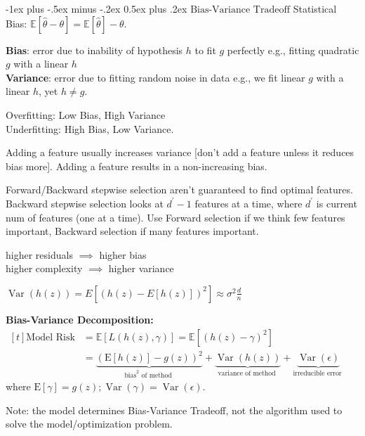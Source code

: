 \documentclass[10pt,landscape]{article}
\makeatletter
\DeclareMathOperator*{\Var}{Var}
\def\E{\mathbb{E}}
\renewcommand{\section}{\@startsection{section}{1}{0mm}%
                                {-1ex plus -.5ex minus -.2ex}%
                                {0.5ex plus .2ex}%
                                {\normalfont\large\bfseries}}
\makeatother
\begin{document}
\begin{multicols}{3}
\section{$\boxed{\text{Bias-Variance Tradeoff}}$}
Statistical Bias: $\E[\hat\theta-\theta]=\E[\hat\theta]-\theta$.

\textbf{Bias}: error due to inability of hypothesis $h$ to fit $g$ perfectly e.g., fitting quadratic $g$ with a linear $h$\\
\textbf{Variance}: error due to fitting random noise in data
e.g., we fit linear $g$ with a linear $h$, yet $h \neq g$.

Overfitting: Low Bias, High Variance \\
Underfitting: High Bias, Low Variance.

Adding a feature usually increases variance [don’t add a feature unless it reduces bias more]. Adding a feature results in a non-increasing bias. 

Forward/Backward stepwise selection aren't guaranteed to find optimal features. Backward stepwise selection looks at $d^{\prime}-1$ features at a time, where $d^{\prime}$ is current num of features (one at a time). Use Forward selection if we think few features important, Backward selection if many features important.

higher residuals $\implies$ higher bias\\
higher complexity $\implies$ higher variance

$\Var(h(z)) = E\left[(h(z)-E[h(z)])^{2}\right] \approx \sigma^2\frac d n$

\textbf{Bias-Variance Decomposition:} \\
$\begin{aligned}[t] \text{Model Risk} &=\E[L(h(z), \gamma)]
=\E[(h(z)-\gamma)^2] \\
&=\underbrace{(\mathrm{E}[h(z)]-g(z))^{2}}_{\text {bias}^{2} \text { of method }}+\underbrace{\operatorname{Var}(h(z))}_{\text {variance of method }}+\underbrace{\operatorname{Var}(\epsilon)}_{\text {irreducible error }}
\end{aligned}$ where $\mathrm{E}[\gamma]=g(z) ; \operatorname{Var}(\gamma)=\operatorname{Var}(\epsilon)$.

Note: the model determines Bias-Variance Tradeoff, not the algorithm used to solve the model/optimization problem.


\end{multicols}
\end{document}
